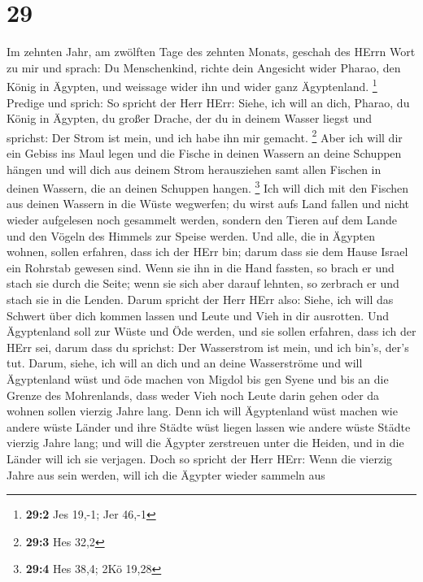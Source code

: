\hypertarget{section-28}{%
\section{29}\label{section-28}}

 Im zehnten Jahr, am zwölften Tage des zehnten Monats,
geschah des HErrn Wort zu mir und sprach:  Du
Menschenkind, richte dein Angesicht wider Pharao, den König in Ägypten,
und weissage wider ihn und wider ganz Ägyptenland. \footnote{\textbf{29:2}
  Jes 19,-1; Jer 46,-1}  Predige und sprich: So spricht
der Herr HErr: Siehe, ich will an dich, Pharao, du König in Ägypten, du
großer Drache, der du in deinem Wasser liegst und sprichst: Der Strom
ist mein, und ich habe ihn mir gemacht. \footnote{\textbf{29:3} Hes 32,2}
 Aber ich will dir ein Gebiss ins Maul legen und die
Fische in deinen Wassern an deine Schuppen hängen und will dich aus
deinem Strom herausziehen samt allen Fischen in deinen Wassern, die an
deinen Schuppen hangen. \footnote{\textbf{29:4} Hes 38,4; 2Kö 19,28}
 Ich will dich mit den Fischen aus deinen Wassern in die
Wüste wegwerfen; du wirst aufs Land fallen und nicht wieder aufgelesen
noch gesammelt werden, sondern den Tieren auf dem Lande und den Vögeln
des Himmels zur Speise werden.  Und alle, die in Ägypten
wohnen, sollen erfahren, dass ich der HErr bin; darum dass sie dem Hause
Israel ein Rohrstab gewesen sind.  Wenn sie ihn in die
Hand fassten, so brach er und stach sie durch die Seite; wenn sie sich
aber darauf lehnten, so zerbrach er und stach sie in die Lenden.
 Darum spricht der Herr HErr also: Siehe, ich will das
Schwert über dich kommen lassen und Leute und Vieh in dir ausrotten.
 Und Ägyptenland soll zur Wüste und Öde werden, und sie
sollen erfahren, dass ich der HErr sei, darum dass du sprichst: Der
Wasserstrom ist mein, und ich bin's, der's tut.  Darum,
siehe, ich will an dich und an deine Wasserströme und will Ägyptenland
wüst und öde machen von Migdol bis gen Syene und bis an die Grenze des
Mohrenlands,  dass weder Vieh noch Leute darin gehen oder
da wohnen sollen vierzig Jahre lang.  Denn ich will
Ägyptenland wüst machen wie andere wüste Länder und ihre Städte wüst
liegen lassen wie andere wüste Städte vierzig Jahre lang; und will die
Ägypter zerstreuen unter die Heiden, und in die Länder will ich sie
verjagen.  Doch so spricht der Herr HErr: Wenn die
vierzig Jahre aus sein werden, will ich die Ägypter wieder sammeln aus
